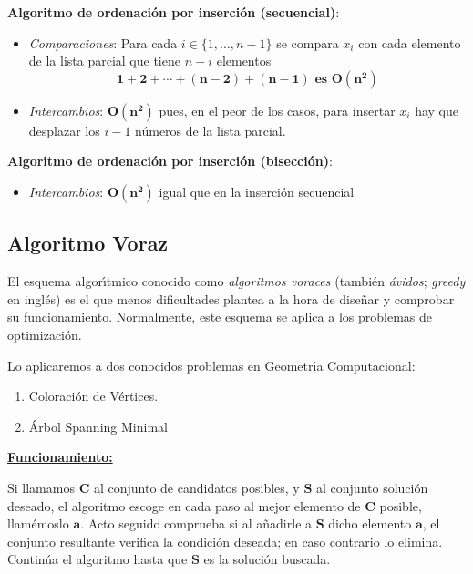 \documentclass[twoside]{report}
\newcommand{\bs}[1]{\boldsymbol{#1}}
\begin{document}
 \noindent\textbf{Algoritmo de ordenaci\'{o}n por inserci\'{o}n (secuencial)}:
    \begin{itemize}
       \item \emph{Comparaciones}: Para cada $i\in \{1,\ldots, n-1\}$ se compara $x_i$ con cada elemento de la lista parcial que tiene $n-i$ elementos $$\bs{1+2+\cdots +(n-2)+(n-1) \mbox{ es } O(n^2)}$$

       \item \emph{Intercambios}: $\bs{O(n^2)}$ pues, en el peor de los casos, para insertar $x_i$ hay que desplazar los $i-1$ n\'{u}meros de la lista parcial.
    \end{itemize}


 \noindent\textbf{Algoritmo de ordenaci\'{o}n por inserci\'{o}n (bisecci\'{o}n)}:
    \begin{itemize}
        \item \emph{Intercambios}: $\bs{O(n^2)}$ igual que en la inserci\'{o}n secuencial
    \end{itemize}


\subsection{Algoritmo Voraz}

El esquema algor\'{\i}tmico conocido como \emph{algoritmos voraces} (tambi\'{e}n \emph{\'{a}vidos}; \emph{greedy} en ingl\'{e}s) es el que menos dificultades plantea a la hora de dise\~{n}ar y comprobar su funcionamiento. Normalmente, este esquema se aplica a los problemas de optimizaci\'{o}n.
\vspace{0.2cm}

Lo aplicaremos a dos conocidos problemas en Geometr\'{\i}a Computacional:
        \begin{enumerate}
            \item Coloraci\'{o}n de V\'{e}rtices.
            \item \'{A}rbol Spanning Minimal
        \end{enumerate}

\noindent\underline{\textbf{Funcionamiento:}}
\vspace{0.2cm}

Si llamamos $\bs{C}$ al conjunto de candidatos posibles, y $\bs{S}$ al conjunto soluci\'{o}n deseado, el algoritmo escoge en cada paso al mejor
elemento de $\bs{C}$ posible, llam\'{e}moslo $\bs{a}$. Acto seguido comprueba si al a\~{n}adirle a $\bs{S}$ dicho elemento $\bs{a}$, el conjunto
resultante verifica la condici\'{o}n deseada; en caso contrario lo elimina. Contin\'{u}a el algoritmo hasta que $\bs{S}$ es la soluci\'{o}n buscada.
\end{document}
